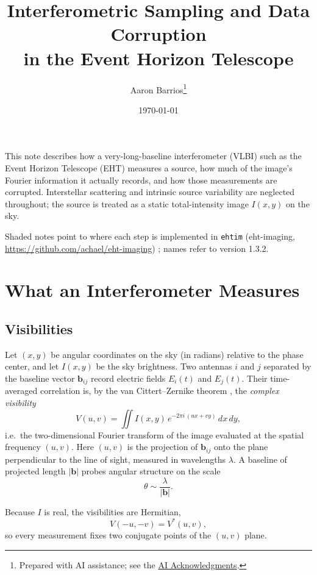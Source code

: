 \documentclass[11pt]{article}
\title{Interferometric Sampling and Data Corruption\\in the Event Horizon Telescope}
\author{Aaron Barrios\thanks{Prepared with AI assistance; see the \hyperref[sec:ai]{AI Acknowledgments}.}}
\date{\today}
\begin{document}
\maketitle

\noindent This note describes how a very-long-baseline interferometer (VLBI)
such as the Event Horizon Telescope (EHT) measures a source, how much of the
image's Fourier information it actually records, and how those measurements
are corrupted. Interstellar scattering and intrinsic source variability are
neglected throughout; the source is treated as a static total-intensity image
$I(x,y)$ on the sky.

Shaded notes point to where each step is implemented in \texttt{ehtim}
(eht-imaging, \url{https://github.com/achael/eht-imaging}) \cite{Chael2018};
names refer to version 1.3.2.

\section{What an Interferometer Measures}

\subsection{Visibilities}

Let $(x,y)$ be angular coordinates on the sky (in radians) relative to the
phase center, and let $I(x,y)$ be the sky brightness. Two antennas $i$ and $j$
separated by the baseline vector $\mathbf{b}_{ij}$ record electric fields
$E_i(t)$ and $E_j(t)$. Their time-averaged correlation is, by the
van Cittert--Zernike theorem \cite{TMS2017}, the \emph{complex visibility}
\begin{equation}
V(u,v) = \iint I(x,y)\, e^{-2\pi i\,(ux + vy)}\,dx\,dy,
\label{eq:vis}
\end{equation}
i.e.\ the two-dimensional Fourier transform of the image evaluated at the
spatial frequency $(u,v)$. Here $(u,v)$ is the projection of
$\mathbf{b}_{ij}$ onto the plane perpendicular to the line of sight,
measured in wavelengths $\lambda$. A baseline of projected length $|\mathbf{b}|$
probes angular structure on the scale
\begin{equation}
\theta \sim \frac{\lambda}{|\mathbf{b}|}.
\end{equation}

Because $I$ is real, the visibilities are Hermitian,
\begin{equation}
V(-u,-v) = V^*(u,v),
\end{equation}
so every measurement fixes two conjugate points of the $(u,v)$ plane.
\end{document}
